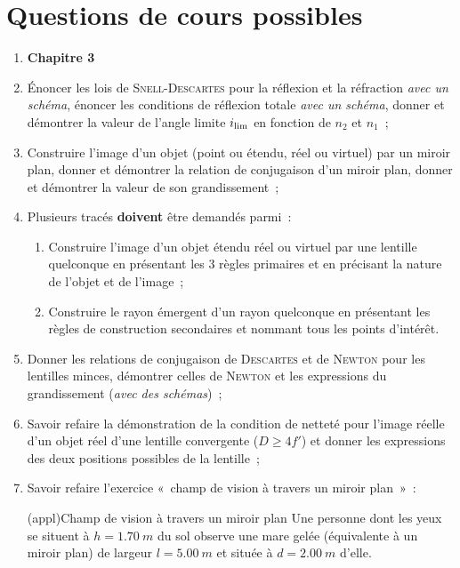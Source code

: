 \documentclass[a4paper, 12pt, final, garamond]{book}
\begin{document}
\section{Questions de cours possibles}
\begin{enumerate}
	\item [] \textbf{Chapitre 3}
	\item Énoncer les lois de \textsc{Snell-Descartes} pour la réflexion et la
	      réfraction \textit{avec un schéma}, énoncer les conditions de réflexion
	      totale \textit{avec un schéma}, donner et démontrer la valeur de l'angle
	      limite $i_{\rm lim}$ en fonction de $n_2$ et $n_1$~;
	\item Construire l'image d'un objet (point ou étendu, réel ou virtuel) par
	      un miroir plan, donner et démontrer la relation de conjugaison d'un
	      miroir plan, donner et démontrer la valeur de son grandissement~;
	\item Plusieurs tracés \textbf{doivent} être demandés parmi~:
	      \begin{enumerate}
		      \item Construire l'image d'un objet étendu réel ou virtuel par une
		            lentille quelconque en présentant les 3 règles primaires et en
		            précisant la nature de l'objet et de l'image~;
		      \item Construire le rayon émergent d'un rayon quelconque en
		            présentant les règles de construction secondaires et nommant
		            tous les points d'intérêt.
	      \end{enumerate}
	\item Donner les relations de conjugaison de \textsc{Descartes} et de
	      \textsc{Newton} pour les lentilles minces, démontrer celles de
	      \textsc{Newton} et les expressions du grandissement (\textit{avec des
		      schémas})~;
	\item Savoir refaire la démonstration de la condition de netteté pour
	      l'image réelle d'un objet réel d'une lentille convergente ($D \geq 4f'$)
	      et donner les expressions des deux positions possibles de la lentille~;
	\item Savoir refaire l'exercice «~champ de vision à travers un miroir plan~»~:
	      \begin{tcb}(appl){Champ de vision à travers un miroir plan}
		      Une personne dont les yeux se situent à $h = \SI{1.70}{m}$ du sol
		      observe une mare gelée (équivalente à un miroir plan) de largeur $l =
			      \SI{5.00}{m}$ et située à $d = \SI{2.00}{m}$ d'elle.

\end{tcb}
\end{enumerate}
\end{document}
